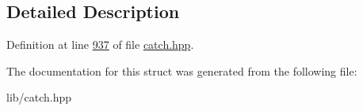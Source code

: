 \subsection{Detailed Description}


Definition at line \mbox{\hyperlink{catch_8hpp_source_l00937}{937}} of file \mbox{\hyperlink{catch_8hpp_source}{catch.\+hpp}}.



The documentation for this struct was generated from the following file\+:\begin{DoxyCompactItemize}
\item 
lib/catch.\+hpp\end{DoxyCompactItemize}
